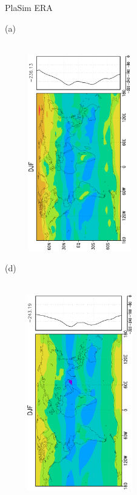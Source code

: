 \documentclass[12pt,a4paper,twoside,openright,headinclude,liststotoc,bibtotoc]{scrreprt}
\begin{document}
\begin{figure}[H]
\hspace{3.0cm}PlaSim \vspace{0.2cm}\hspace{7.2cm} ERA \\
\parbox{8.5cm}{\hspace{0.50cm}\begin{scriptsize}(a)\end{scriptsize} \vspace{-0.7cm} \\
\includegraphics[height=8.5cm,width=6.5cm,angle=-90]
{eps/zonalysmthermrad179DJF.eps}
}
\parbox{8.5cm}{\hspace{0.26cm}\begin{scriptsize}(d)\end{scriptsize} \vspace{-0.7cm} \\
\includegraphics[height=8.5cm,width=6.5cm,angle=-90]
{eps/zonalt21ysmthermradDJF.eps}
}
\end{figure}
\end{document}
